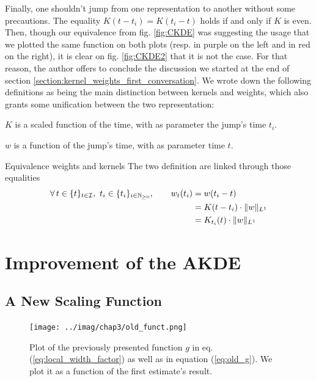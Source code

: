 \documentclass[11pt]{book}
\newcommand{\sequence}[1]{\{ #1 \}_{ i \in \N} }
\newcommand{\sequencetime}{\{t\}_{t \in \mathcal I} }
\begin{document}
\newpage 
Finally, one shouldn't jump from one representation to another without some precautions. The equality $K(t - t_i) = K(t_i - t)$ holds if and only if $K$ is even. Then, though our equivalence from fig. \ref{fig:CKDE} was suggesting the usage that we plotted the same function on both plots (resp. in purple on the left and in red on the right), it is clear on fig. \ref{fig:CKDE2} that it is not the case. For that reason, the author offers to conclude the discussion we started at the end of section \ref{section:kernel_weights_first_conversation}. We wrote down the following definitions as being the main distinction between kernels and weights, which also grants some unification between the two representation:
\begin{definition}[Kernel]
$K$ is a scaled function of the time, with as parameter the jump's time $t_i$.
\end{definition}

\begin{definition}
$w$ is a function of the jump's time, with as parameter time $t$.
\end{definition}

\begin{theoreme}[label = thrm:equiv_w_k]{Equivalence weights and kernels}
The two definition are linked through those equalities
\begin{align*}
\forall t \in \sequencetime, \ t_i \in \sequence{t_i }, \qquad w_t(t_i) 
&= w(t_i - t) \\
&=  K(t - t_i) \cdot \norm{w}_{L^1} \\
&= K_{t_i}(t) \cdot \norm{w}_{L^1}
\end{align*}
\end{theoreme}





\section{Improvement of the AKDE}
\subsection{A New Scaling Function}


\begin{figure}
\centering
\texttt{[image: ../imag/chap3/old\_funct.png]}
\caption{Plot of the previously presented function $g$ in eq. (\ref{eq:local_width_factor}) as well as in equation (\ref{eq:old_g}). We plot it as a function of the first estimate's result.}
\label{fig:old_scaling}
\end{figure}
\end{document}
